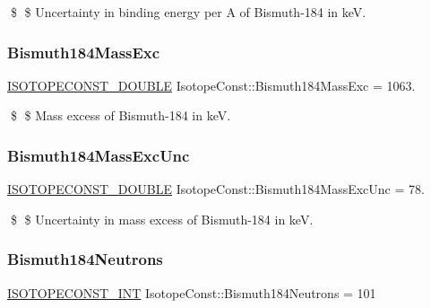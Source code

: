 \$ \$ Uncertainty in binding energy per A of Bismuth-\/184 in keV. \mbox{\label{group___isotope_const-_bismuth-_bi184_ga88a4a80dd2c29279335c8738337097a7}} 
\subsubsection{\texorpdfstring{Bismuth184\+Mass\+Exc}{Bismuth184MassExc}}
{\footnotesize\ttfamily \mbox{\hyperlink{group___isotope_const-_macros_ga8f45a7272ce02c0b4c65c44636ed719a}{I\+S\+O\+T\+O\+P\+E\+C\+O\+N\+S\+T\+\_\+\+D\+O\+U\+B\+LE}} Isotope\+Const\+::\+Bismuth184\+Mass\+Exc = 1063.}

\$ \$ Mass excess of Bismuth-\/184 in keV. \mbox{\label{group___isotope_const-_bismuth-_bi184_ga35ac38826373900f20e28205091886fe}} 
\subsubsection{\texorpdfstring{Bismuth184\+Mass\+Exc\+Unc}{Bismuth184MassExcUnc}}
{\footnotesize\ttfamily \mbox{\hyperlink{group___isotope_const-_macros_ga8f45a7272ce02c0b4c65c44636ed719a}{I\+S\+O\+T\+O\+P\+E\+C\+O\+N\+S\+T\+\_\+\+D\+O\+U\+B\+LE}} Isotope\+Const\+::\+Bismuth184\+Mass\+Exc\+Unc = 78.}

\$ \$ Uncertainty in mass excess of Bismuth-\/184 in keV. \mbox{\label{group___isotope_const-_bismuth-_bi184_ga7fe8ff4a3721976642c9eb7c8bb52cc6}} 
\subsubsection{\texorpdfstring{Bismuth184\+Neutrons}{Bismuth184Neutrons}}
{\footnotesize\ttfamily \mbox{\hyperlink{group___isotope_const-_macros_ga5f18360b3e99483a35c32d789e62621c}{I\+S\+O\+T\+O\+P\+E\+C\+O\+N\+S\+T\+\_\+\+I\+NT}} Isotope\+Const\+::\+Bismuth184\+Neutrons = 101}

